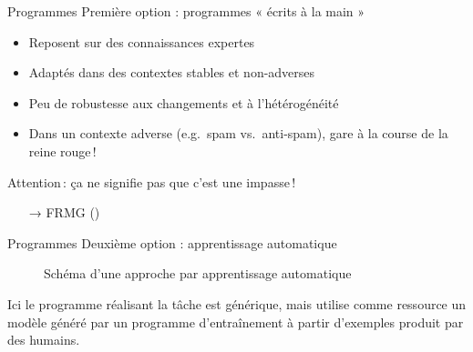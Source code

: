 \documentclass[hyperref={unicode}, xcolor={svgnames}, french]{beamer}
\begin{document}
\begin{frame}{Programmes}
    Première option : programmes « écrits à la main »
    \begin{itemize}
        \item Reposent sur des connaissances expertes
        \item Adaptés dans des contextes stables et non-adverses
        \item Peu de robustesse aux changements et à l'hétérogénéité
        \item Dans un contexte adverse (e.g.\ spam vs.\ anti-spam), gare à la course de la reine rouge !
    \end{itemize}
    Attention : ça ne signifie pas que c'est une impasse !
    \begin{itemize}
        \item[→] FRMG ()
    \end{itemize}
\end{frame}

\begin{frame}[fragile=singleslide]{Programmes}
    Deuxième option : apprentissage automatique
    \begin{figure}
        \tikzset{external/export=true}
        \caption{Schéma d'une approche par apprentissage automatique}
    \end{figure}
    Ici le \textcolor{highlighta}{programme réalisant la tâche} est générique, mais utilise comme ressource un \textcolor{highlight3}{modèle} généré par un \textcolor{highlight6}{programme d'entraînement} à partir d'\textcolor{highlight7}{exemples} produit par des humains.
\end{frame}
\end{document}
